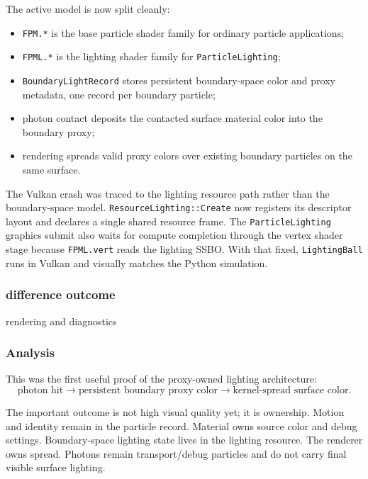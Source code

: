 The active model is now split cleanly:
\begin{itemize}
    \item \texttt{FPM.*} is the base particle shader family for ordinary
          particle applications;
    \item \texttt{FPML.*} is the lighting shader family for
          \texttt{ParticleLighting};
    \item \texttt{BoundaryLightRecord} stores persistent boundary-space color
          and proxy metadata, one record per boundary particle;
    \item photon contact deposits the contacted surface material color into
          the boundary proxy;
    \item rendering spreads valid proxy colors over existing boundary
          particles on the same surface.
\end{itemize}

The Vulkan crash was traced to the lighting resource path rather than the
boundary-space model.  \texttt{ResourceLighting::Create} now registers its
descriptor layout and declares a single shared resource frame.  The
\texttt{ParticleLighting} graphics submit also waits for compute completion
through the vertex shader stage because \texttt{FPML.vert} reads the lighting
SSBO.  With that fixed, \texttt{LightingBall} runs in Vulkan and visually
matches the Python simulation.

\subsubsection{difference outcome}

rendering and diagnostics

\subsubsection{Analysis}

This was the first useful proof of the proxy-owned lighting architecture:
\[
    \textrm{photon hit}
    \rightarrow
    \textrm{persistent boundary proxy color}
    \rightarrow
    \textrm{kernel-spread surface color}.
\]

The important outcome is not high visual quality yet; it is ownership.  Motion
and identity remain in the particle record.  Material owns source color and
debug settings.  Boundary-space lighting state lives in the lighting resource.
The renderer owns spread.  Photons remain transport/debug particles and do not
carry final visible surface lighting.

